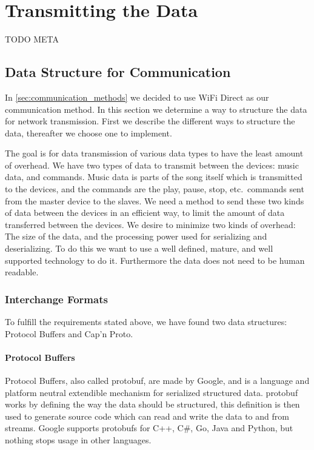 \section{Transmitting the Data}\label{sec:transmitting_the_data}
TODO META

\subsection{Data Structure for Communication}\label{sec:transmit}
In \cref{sec:communication_methods} we decided to use WiFi Direct as our communication method.
In this section we determine a way to structure the data for network transmission. 
First we describe the different ways to structure the data, thereafter we choose one to implement.

\bigskip
The goal is for data transmission of various data types to have the least amount of overhead.
We have two types of data to transmit between the devices: music data, and commands.
Music data is parts of the song itself which is transmitted to the devices,
and the commands are the play, pause, stop, etc.\ commands sent from the master device to the slaves.
We need a method to send these two kinds of data between the devices in an efficient way,
to limit the amount of data transferred between the devices.
We desire to minimize two kinds of overhead: The size of the data, and the processing power used for serializing and deserializing.
To do this we want to use a well defined, mature, and well supported technology to do it.
Furthermore the data does not need to be human readable.

\subsubsection{Interchange Formats}
To fulfill the requirements stated above, we have found two data structures: Protocol Buffers and Cap'n Proto. 

\paragraph{Protocol Buffers}
Protocol Buffers, also called protobuf, are made by Google, and is a language and platform neutral extendible mechanism for serialized structured data.
protobuf works by defining the way the data should be structured, this definition is then used to generate source code which can read and write the data to and from streams.\cite{protobuf}
Google supports protobufs for C++, C\#, Go, Java and Python, but nothing stops usage in other languages\cite{protobuf}.

